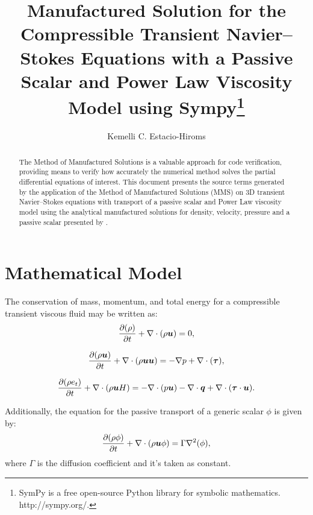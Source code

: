 \documentclass[10pt]{article}
\title{Manufactured Solution for the Compressible Transient Navier--Stokes Equations  with a Passive Scalar and Power Law Viscosity Model using Sympy\footnote{SymPy is a free open-source Python library for symbolic mathematics.  http://sympy.org/.}}
\author{Kemelli C. Estacio-Hiroms}
\newcommand{\D}{\partial}
\newcommand{\Diff}[2] {\dfrac{\partial( #1)}{\partial #2}}
\newcommand{\bv}[1]{\ensuremath{\mbox{\boldmath$ #1 $}}}
\begin{document}
\maketitle

\begin{abstract}
The Method of Manufactured Solutions is a valuable approach for code verification, providing means to verify how accurately the numerical method solves the partial differential equations of interest.
This document presents the source terms generated by the application of the Method of Manufactured Solutions (MMS) on 3D transient Navier--Stokes equations  with transport of a passive scalar and Power Law viscosity model using the analytical manufactured solutions for density, velocity, pressure and a passive scalar presented by \citet{Roy2002}.
\end{abstract}





\section{Mathematical Model}
The conservation of mass, momentum, and total energy for a compressible transient viscous fluid may be written as:
\begin{equation}
 \label{eq:ns_01}
\Diff{\rho}{t} +\nabla \cdot \left(\rho \bv{u}\right) = 0,
\end{equation}

\begin{equation}
 \label{eq:ns_02}
\Diff{\rho \bv{u}}{t} +\nabla\cdot\left(\rho\bv{u}\bv{u}\right) = -\nabla p+  \nabla \cdot (\bv{\tau} ),
\end{equation}

\begin{equation}
 \label{eq:ns_03}
\Diff{\rho e_t}{t} +\nabla\cdot\left(\rho \bv{u} H\right) =-   \nabla\cdot(p  \bv{u}) -\nabla\cdot \bv{q} +  \nabla \cdot (\bv{\tau} \cdot \bv{u}).
\end{equation}

Additionally, the equation for the passive transport of a generic scalar $\phi$ is given by:
\begin{equation}
 \label{eq:ns_pscalar}
  \frac{\D (\rho \phi)}{\D t} + \nabla\cdot\left(\rho\bv{u}\phi\right) = \Gamma \nabla^2 (\phi),
\end{equation}
where $\Gamma$ is the diffusion coefficient and it's taken as constant.
\end{document}
